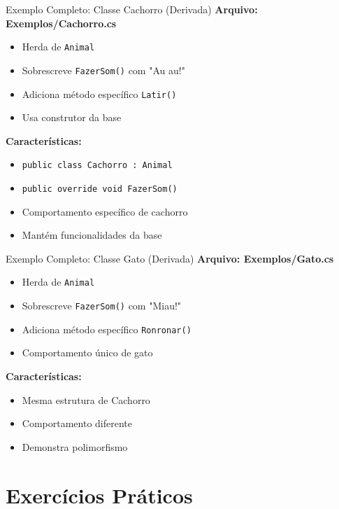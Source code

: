 \documentclass[aspectratio=169]{beamer}
\begin{document}
\begin{frame}{Exemplo Completo: Classe Cachorro (Derivada)}
\textbf{Arquivo: Exemplos/Cachorro.cs}
\begin{itemize}
\item Herda de \texttt{Animal}
\item Sobrescreve \texttt{FazerSom()} com "Au au!"
\item Adiciona método específico \texttt{Latir()}
\item Usa construtor da base
\end{itemize}

\vspace{0.3cm}
\textbf{Características:}
\begin{itemize}
\item \texttt{public class Cachorro : Animal}
\item \texttt{public override void FazerSom()}
\item Comportamento específico de cachorro
\item Mantém funcionalidades da base
\end{itemize}
\end{frame}

\begin{frame}{Exemplo Completo: Classe Gato (Derivada)}
\textbf{Arquivo: Exemplos/Gato.cs}
\begin{itemize}
\item Herda de \texttt{Animal}
\item Sobrescreve \texttt{FazerSom()} com "Miau!"
\item Adiciona método específico \texttt{Ronronar()}
\item Comportamento único de gato
\end{itemize}

\vspace{0.3cm}
\textbf{Características:}
\begin{itemize}
\item Mesma estrutura de Cachorro
\item Comportamento diferente
\item Demonstra polimorfismo
\end{itemize}
\end{frame}

\section{Exercícios Práticos}
\end{document}
